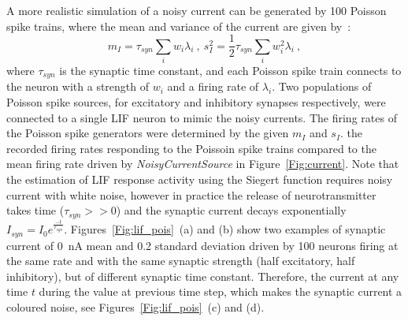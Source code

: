 	A more realistic simulation of a noisy current can be generated by 100 Poisson spike trains, 
	where the mean and variance of the current are given by~\DIFdelbegin {}\DIFdelend \DIFaddbegin {}\DIFaddend :
	\begin{equation}
	m_I = \tau_{syn}\sum_i w_i\lambda_{i}~, ~s_I^2=\frac{1}{2}\tau_{syn}\sum_i w_i^2\lambda_{i}~,
	\label{equ:distr0}
	\end{equation}
	where $\tau_{syn}$ is the synaptic time constant, and each Poisson spike train connects to the neuron with a strength of $w_i$ and a firing rate of $\lambda_i$.
	Two populations of Poisson spike sources, for excitatory and inhibitory synapses respectively, were connected to a single LIF neuron to mimic the noisy currents.
	The firing rates of the Poisson spike generators were determined by the given $m_I$ and $s_I$.
	\DIFdelbegin {}\DIFdelend \DIFaddbegin {}\DIFaddend the recorded firing rates responding to the Poissoin spike trains compared to the mean firing rate driven by \textit{NoisyCurrentSource} in Figure~\ref{Fig:current}.
	Note that the estimation of LIF response activity using the Siegert function requires noisy current with white noise, however
	in practice the release of neurotransmitter takes time ($\tau_{syn} >> 0$) and the synaptic current decays exponentially $I_{syn} = I_0 e^{\frac{-t}{\tau_{syn}}}$.
	Figures~\ref{Fig:lif_pois}~(a) and (b) show two examples of synaptic current of 0~nA mean and 0.2 standard deviation driven by 100 neurons firing at the same rate and with the same synaptic strength (half excitatory, half inhibitory), but of different synaptic time constant.
	Therefore, the current at any time $t$ during \DIFdelbegin {}\DIFdelend \DIFaddbegin {}\DIFaddend the value at \DIFaddbegin {}\DIFaddend previous time step, which makes the synaptic current a coloured noise, see Figures~\ref{Fig:lif_pois}~(c) and (d).

